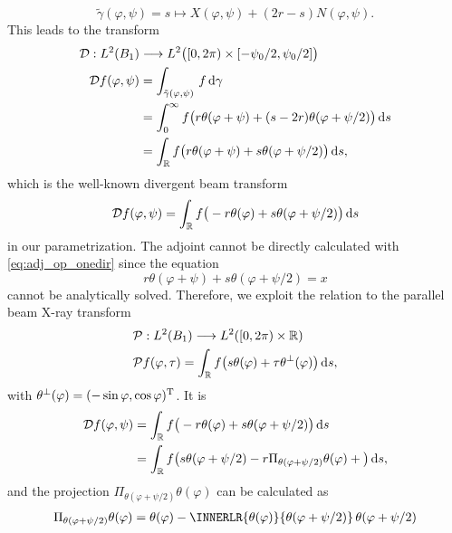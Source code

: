 \documentclass{amsart}
\renewcommand*{\phi}{\varphi}
\begin{document}
\begin{example}
 \begin{equation*}
  \tilde \gamma(\phi, \psi) = s \mapsto X(\phi,\psi) + (2r-s) N(\phi,\psi).
 \end{equation*}
 This leads to the transform
 \begin{align}
  \OPD: L^2(B_1) &\Lto L^2\big([0,2\pi) \times [-\psi_0/2, \psi_0/2]\big)\\
  \OPD f(\phi, \psi)
  &= \int_{\tilde \gamma(\phi,\psi)}\, f \, \D \gamma \notag \\
  &= \int_0^\infty f\big(r\theta(\phi + \psi) + (s-2r)\theta(\phi + \psi/2)\big)\, \D s \notag \\
  \label{eq:fanbeam_fwd_op_parametr}
  &= \int_\RR f\big(r\theta(\phi + \psi) + s\theta(\phi + \psi/2)\big)\, \D s,
 \end{align}
 which is the well-known divergent beam transform
 \begin{equation*}
  \OPD f(\phi, \psi) = \int_\RR f\big(- r\theta(\phi) + s \theta(\phi + \psi/2)\big)\, \D s
 \end{equation*}
 in our parametrization. The adjoint cannot be directly calculated with \eqref{eq:adj_op_onedir} since the equation 
 \begin{equation*}
  r\theta(\phi + \psi) + s\theta(\phi + \psi/2) = x
 \end{equation*}
 cannot be analytically solved. Therefore, we exploit the relation to the parallel beam X-ray transform 
 \begin{align}
  \label{eq:fanbeam_xray_trafo_param}
  &\OPP: L^2(B_1) \Lto L^2([0,2\pi) \times \RR) \\
  &\OPP f(\phi, \tau) = \int_\RR f\big(s\theta(\phi) + \tau \theta^\perp(\phi)\big)\, \D s,
 \end{align} 
 with $\theta^\perp(\phi) = \TRANSP{(-\sin\phi, \cos\phi)}$. It is
 \begin{align*}
  \OPD f(\phi, \psi) 
  &= \int_\RR f\big(- r\theta(\phi) + s \theta(\phi + \psi/2)\big)\, \D s \\
  &= \int_\RR f\big(s \theta(\phi + \psi/2) - r \Pi_{\theta(\phi + \psi/2)}\theta(\phi) + \big)\, \D s,
 \end{align*}
 and the projection $\Pi_{\theta(\phi + \psi/2)}\theta(\phi)$ can be calculated as
 \begin{align*}
  \Pi_{\theta(\phi + \psi/2)}\theta(\phi)
  &= \theta(\phi) - \INNERLR{\theta(\phi)}{\theta(\phi + \psi/2)}\, \theta(\phi + \psi/2) \\

\end{align*}
\end{example}
\end{document}
